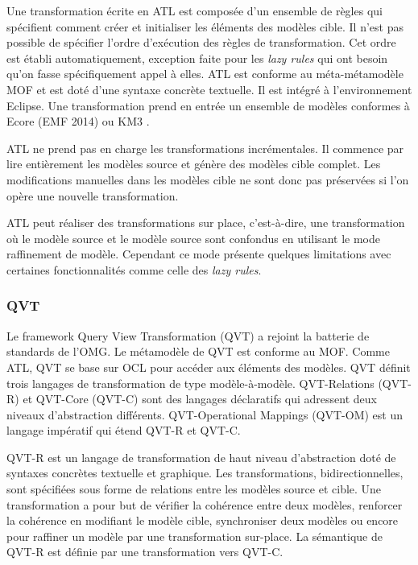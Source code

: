 Une transformation écrite en ATL est composée d'un ensemble de règles qui 
spécifient comment créer et initialiser les éléments des modèles cible. Il n'est 
pas possible de spécifier l'ordre d'exécution des règles de transformation. Cet 
ordre est établi automatiquement, exception faite pour les \textit{lazy rules} 
qui ont besoin qu'on fasse spécifiquement appel à elles. ATL est conforme au 
méta-métamodèle MOF et est doté d'une syntaxe concrète textuelle. Il est intégré 
à l'environnement Eclipse. Une transformation prend en entrée un ensemble de 
modèles conformes à Ecore (EMF 2014) ou KM3 \cite{jouault2006km3}.

ATL ne prend pas en charge les transformations incrémentales. Il commence par 
lire entièrement les modèles source et génère des modèles cible complet. Les 
modifications manuelles dans les modèles cible ne sont donc pas préservées si 
l'on opère une nouvelle transformation.

ATL peut réaliser des transformations sur  place, c'est-à-dire, une 
transformation où le modèle source et le modèle source sont confondus en 
utilisant le mode raffinement de modèle. Cependant ce mode présente quelques 
limitations avec certaines fonctionnalités comme celle des \textit{lazy rules}.

\subsubsection{QVT}
Le framework Query View Transformation (QVT) \cite{kurtev2008state} 
\cite{omg2011meta} a rejoint la batterie de standards de l'OMG. Le métamodèle de 
QVT est conforme au MOF. Comme ATL, QVT se base sur OCL pour accéder aux 
éléments des modèles.
QVT définit trois langages de transformation de type modèle-à-modèle. 
QVT-Relations (QVT-R) et QVT-Core (QVT-C) sont des langages déclaratifs qui 
adressent deux niveaux d'abstraction différents. QVT-Operational Mappings 
(QVT-OM) est un langage impératif qui étend QVT-R et QVT-C.

QVT-R est un langage de transformation de haut niveau d'abstraction doté de 
syntaxes concrètes textuelle et graphique. Les transformations, 
bidirectionnelles, sont spécifiées sous forme de relations entre les modèles 
source et cible. Une transformation a pour but de vérifier la cohérence entre 
deux modèles, renforcer la cohérence en modifiant le modèle cible, synchroniser 
deux modèles ou encore pour raffiner un modèle par une transformation sur-place. 
La sémantique de QVT-R est définie par une transformation vers QVT-C.

